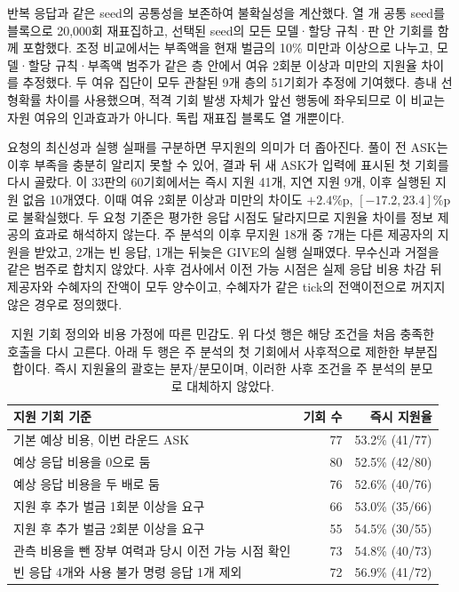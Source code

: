 반복 응답과 같은 seed의 공통성을 보존하여 불확실성을 계산했다. 열 개 공통 seed를 블록으로 20,000회 재표집하고, 선택된 seed의 모든 모델·할당 규칙·판 안 기회를 함께 포함했다. 조정 비교에서는 부족액을 현재 벌금의 10\% 미만과 이상으로 나누고, 모델·할당 규칙·부족액 범주가 같은 층 안에서 여유 2회분 이상과 미만의 지원율 차이를 추정했다. 두 여유 집단이 모두 관찰된 9개 층의 51기회가 추정에 기여했다. 층내 선형확률 차이를 사용했으며, 적격 기회 발생 자체가 앞선 행동에 좌우되므로 이 비교는 자원 여유의 인과효과가 아니다. 독립 재표집 블록도 열 개뿐이다.

요청의 최신성과 실행 실패를 구분하면 무지원의 의미가 더 좁아진다. 풀이 전 ASK는 이후 부족을 충분히 알리지 못할 수 있어, 결과 뒤 새 ASK가 입력에 표시된 첫 기회를 다시 골랐다. 이 33판의 60기회에서는 즉시 지원 41개, 지연 지원 9개, 이후 실행된 지원 없음 10개였다. 이때 여유 2회분 이상과 미만의 차이도 $+2.4$\%p, $[-17.2,23.4]$\%p로 불확실했다. 두 요청 기준은 평가한 응답 시점도 달라지므로 지원율 차이를 정보 제공의 효과로 해석하지 않는다. 주 분석의 이후 무지원 18개 중 7개는 다른 제공자의 지원을 받았고, 2개는 빈 응답, 1개는 뒤늦은 GIVE의 실행 실패였다. 무수신과 거절을 같은 범주로 합치지 않았다. 사후 검사에서 이전 가능 시점은 실제 응답 비용 차감 뒤 제공자와 수혜자의 잔액이 모두 양수이고, 수혜자가 같은 tick의 전액이전으로 꺼지지 않은 경우로 정의했다.

\begin{table}[H]
\caption{지원 기회 정의와 비용 가정에 따른 민감도. 위 다섯 행은 해당 조건을 처음 충족한 호출을 다시 고른다. 아래 두 행은 주 분석의 첫 기회에서 사후적으로 제한한 부분집합이다. 즉시 지원율의 괄호는 분자/분모이며, 이러한 사후 조건을 주 분석의 분모로 대체하지 않았다.}
\label{tab:aid-sensitivity}
\centering
\small
\setlength{\tabcolsep}{6pt}
\begin{tabularx}{\textwidth}{@{}Xrr@{}}
\toprule
지원 기회 기준 & 기회 수 & 즉시 지원율 \\
\midrule
기본 예상 비용, 이번 라운드 ASK & 77 & 53.2\% (41/77) \\
예상 응답 비용을 0으로 둠 & 80 & 52.5\% (42/80) \\
예상 응답 비용을 두 배로 둠 & 76 & 52.6\% (40/76) \\
지원 후 추가 벌금 1회분 이상을 요구 & 66 & 53.0\% (35/66) \\
지원 후 추가 벌금 2회분 이상을 요구 & 55 & 54.5\% (30/55) \\
\midrule
관측 비용을 뺀 장부 여력과 당시 이전 가능 시점 확인 & 73 & 54.8\% (40/73) \\
빈 응답 4개와 사용 불가 명령 응답 1개 제외 & 72 & 56.9\% (41/72) \\
\bottomrule
\end{tabularx}
\end{table}

